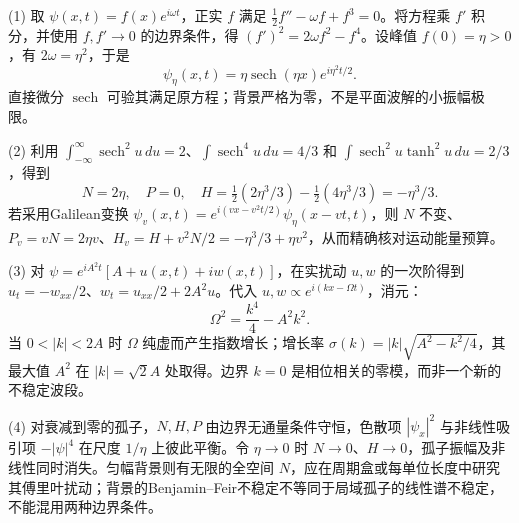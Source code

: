 (1) 取 \(\psi(x,t)=f(x)e^{i\omega t}\)，正实 \(f\) 满足 \(\frac12f''-\omega f+f^3=0\)。将方程乘 \(f'\) 积分，并使用 \(f,f'\to0\) 的边界条件，得
\((f')^2=2\omega f^2-f^4\)。设峰值 \(f(0)=\eta>0\)，有 \(2\omega=\eta^2\)，于是
\[
\boxed{\psi_\eta(x,t)=\eta\operatorname{sech}(\eta x)e^{i\eta^2t/2}}.
\]
直接微分 \(\operatorname{sech}\) 可验其满足原方程；背景严格为零，不是平面波解的小振幅极限。

(2) 利用 \(\int_{-\infty}^\infty\operatorname{sech}^2u\,du=2\)、\(\int\operatorname{sech}^4u\,du=4/3\) 和 \(\int\operatorname{sech}^2u\tanh^2u\,du=2/3\)，得到
\[
\boxed{N=2\eta,\quad P=0,\quad H=\tfrac12(2\eta^3/3)-\tfrac12(4\eta^3/3)=-\eta^3/3}.
\]
若采用Galilean变换 \(\psi_v(x,t)=e^{i(vx-v^2t/2)}\psi_\eta(x-vt,t)\)，则 \(N\) 不变、\(P_v=vN=2\eta v\)、\(H_v=H+v^2N/2=-\eta^3/3+\eta v^2\)，从而精确核对运动能量预算。

(3) 对 \(\psi=e^{iA^2t}[A+u(x,t)+iw(x,t)]\)，在实扰动 \(u,w\) 的一次阶得到
\(u_t=-w_{xx}/2\)、\(w_t=u_{xx}/2+2A^2u\)。代入 \(u,w\propto e^{i(kx-\Omega t)}\)，消元：
\[
\boxed{\Omega^2=\frac{k^4}{4}-A^2k^2}.
\]
当 \(0<|k|<2A\) 时 \(\Omega\) 纯虚而产生指数增长；增长率 \(\sigma(k)=|k|\sqrt{A^2-k^2/4}\)，其最大值 \(A^2\) 在 \(|k|=\sqrt2A\) 处取得。边界 \(k=0\) 是相位相关的零模，而非一个新的不稳定波段。

(4) 对衰减到零的孤子，\(N,H,P\) 由边界无通量条件守恒，色散项 \(|\psi_x|^2\) 与非线性吸引项 \(-|\psi|^4\) 在尺度 \(1/\eta\) 上彼此平衡。令 \(\eta\to0\) 时 \(N\to0\)、\(H\to0\)，孤子振幅及非线性同时消失。匀幅背景则有无限的全空间 \(N\)，应在周期盒或每单位长度中研究其傅里叶扰动；背景的Benjamin--Feir不稳定不等同于局域孤子的线性谱不稳定，不能混用两种边界条件。
